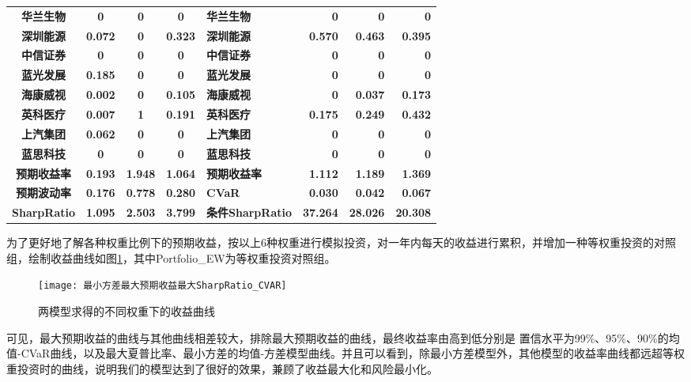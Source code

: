 \documentclass[withoutpreface,bwprint]{cumcmthesis} %
\begin{document}
\begin{table}[H]
\begin{tabular}{c|ccc|l|rrr}
		\textbf{华兰生物} & \textbf{0} & \textbf{0} & \textbf{0} & \textbf{华兰生物} & \textbf{0} & \textbf{0} & \textbf{0} \\
		\textbf{深圳能源} & \textbf{0.072} & \textbf{0} & \textbf{0.323} & \textbf{深圳能源} & \textbf{0.570} & \textbf{0.463} & \textbf{0.395} \\
		\textbf{中信证券} & \textbf{0} & \textbf{0} & \textbf{0} & \textbf{中信证券} & \textbf{0} & \textbf{0} & \textbf{0} \\
		\textbf{蓝光发展} & \textbf{0.185} & \textbf{0} & \textbf{0} & \textbf{蓝光发展} & \textbf{0} & \textbf{0} & \textbf{0} \\
		\textbf{海康威视} & \textbf{0.002} & \textbf{0} & \textbf{0.105} & \textbf{海康威视} & \textbf{0} & \textbf{0.037} & \textbf{0.173} \\
		\textbf{英科医疗} & \textbf{0.007} & \textbf{1} & \textbf{0.191} & \textbf{英科医疗} & \textbf{0.175} & \textbf{0.249} & \textbf{0.432} \\
		\textbf{上汽集团} & \textbf{0.062} & \textbf{0} & \textbf{0} & \textbf{上汽集团} & \textbf{0} & \textbf{0} & \textbf{0} \\
		\textbf{蓝思科技} & \textbf{0} & \textbf{0} & \textbf{0} & \textbf{蓝思科技} & \textbf{0} & \textbf{0} & \textbf{0} \\
		\midrule[1.5pt]
		\textbf{预期收益率} & \textbf{0.193} & \textbf{1.948} & \textbf{1.064} & \textbf{预期收益率} & \textbf{1.112} & \textbf{1.189} & \textbf{1.369} \\
		\textbf{预期波动率} & \textbf{0.176} & \textbf{0.778} & \textbf{0.280} & \textbf{CVaR} & \textbf{0.030} & \textbf{0.042} & \textbf{0.067} \\
		\textbf{SharpRatio} & \textbf{1.095} & \textbf{2.503} & \textbf{3.799} & \textbf{条件SharpRatio} & \textbf{37.264} & \textbf{28.026} & \textbf{20.308} \\
		\bottomrule[1.5pt]
	\end{tabular}%
	\label{两模型投资组合比例及对应的收益风险汇总}%
\end{table}%

为了更好地了解各种权重比例下的预期收益，按以上6种权重进行模拟投资，对一年内每天的收益进行累积，并增加一种等权重投资的对照组，绘制收益曲线如图\ref{两模型求得的不同权重下的收益曲线}，其中Portfolio\_EW为等权重投资对照组。
		\begin{figure}[H]
	\centering
	\texttt{[image: 最小方差最大预期收益最大SharpRatio\_CVAR]}
	\caption{两模型求得的不同权重下的收益曲线}
	\label{两模型求得的不同权重下的收益曲线}
\end{figure}
可见，最大预期收益的曲线与其他曲线相差较大，排除最大预期收益的曲线，最终收益率由高到低分别是
置信水平为99\%、95\%、90\%的均值-CVaR曲线，以及最大夏普比率、最小方差的均值-方差模型曲线。并且可以看到，除最小方差模型外，其他模型的收益率曲线都远超等权重投资时的曲线，说明我们的模型达到了很好的效果，兼顾了收益最大化和风险最小化。
\end{document}
